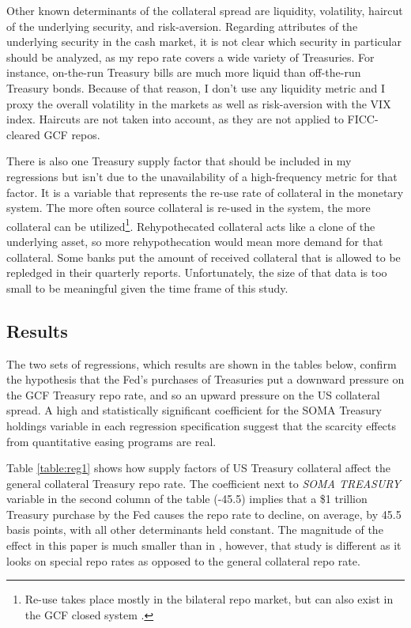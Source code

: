 \documentclass[11pt,a4paper,english,oneside]{article}
\begin{document}
Other known determinants of the collateral spread are liquidity, volatility, haircut of the underlying security, and risk-aversion. Regarding attributes of the underlying security in the cash market, it is not clear which security in particular should be analyzed, as my repo rate covers a wide variety of Treasuries. For instance, on-the-run Treasury bills are much more liquid than off-the-run Treasury bonds. Because of that reason, I don't use any liquidity metric and I proxy the overall volatility in the markets as well as risk-aversion with the VIX index. Haircuts are not taken into account, as they are not applied to FICC-cleared GCF repos.

There is also one Treasury supply factor that should be included in my regressions but isn't due to the unavailability of a high-frequency metric for that factor. It is a variable that represents the re-use rate of collateral in the monetary system. The more often source collateral is re-used in the system, the more collateral can be utilized\footnote{Re-use takes place mostly in the bilateral repo market, but can also exist in the GCF closed system \citep{singh2020}.}. Rehypothecated collateral acts like a clone of the underlying asset, so more rehypothecation would mean more demand for that collateral. Some banks put the amount of received  collateral that is allowed to be repledged in their quarterly reports. Unfortunately, the size of that data is too small to be meaningful given the time frame of this study.

\subsection{Results} \label{sec:results}

The two sets of regressions, which results are shown in the tables below, confirm the hypothesis that the Fed's purchases of Treasuries put a downward pressure on the GCF Treasury repo rate, and so an upward pressure on the US collateral spread. A high and statistically significant coefficient for the SOMA Treasury holdings variable in each regression specification suggest that the scarcity effects from quantitative easing programs are real.

Table \ref{table:reg1} shows how supply factors of US Treasury collateral affect the general collateral Treasury repo rate. The coefficient next to \emph{SOMA TREASURY} variable in the second column of the table (-45.5) implies that a \$1 trillion Treasury purchase by the Fed causes the repo rate to decline, on average, by 45.5 basis points, with all other determinants held constant. The magnitude of the effect in this paper is much smaller than in \citet{damico2014}, however, that study is different as it looks on special repo rates as opposed to the general collateral repo rate.
\end{document}

